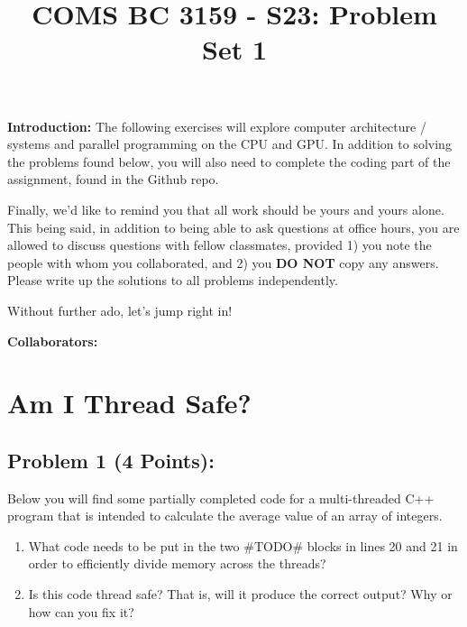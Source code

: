 \documentclass[]{article}
\title{COMS BC 3159 - S23: Problem Set 1}
\author{
}
\date{}
\begin{document}
\maketitle

\textbf{Introduction:}  
The following exercises will explore computer architecture / systems and parallel programming on the CPU and GPU. In addition to solving the problems found below, you will also need to complete the coding part of the assignment, found in the Github repo. 

Finally, we'd like to remind you that all work should be yours and yours alone. This being said, in addition to being able to ask questions at office hours, you are allowed to discuss questions with fellow classmates, provided 1) you note the people with whom you collaborated, and 2) you \textbf{DO NOT} copy any answers. Please write up the solutions to all problems independently.

Without further ado, let's jump right in!

\bigskip
\textbf{Collaborators:}
\clearpage

\section{Am I Thread Safe?}

\subsection*{Problem 1 (4 Points):}
Below you will find some partially completed code for a multi-threaded C++ program that is intended to calculate the average value of an array of integers.
\begin{enumerate}[label=(\alph*)]
    \item What code needs to be put in the two \#TODO\# blocks in lines 20 and 21 in order to efficiently divide memory across the threads?
    \item Is this code thread safe? That is, will it produce the correct output? Why or how can you fix it?
\end{enumerate}
\end{document}
